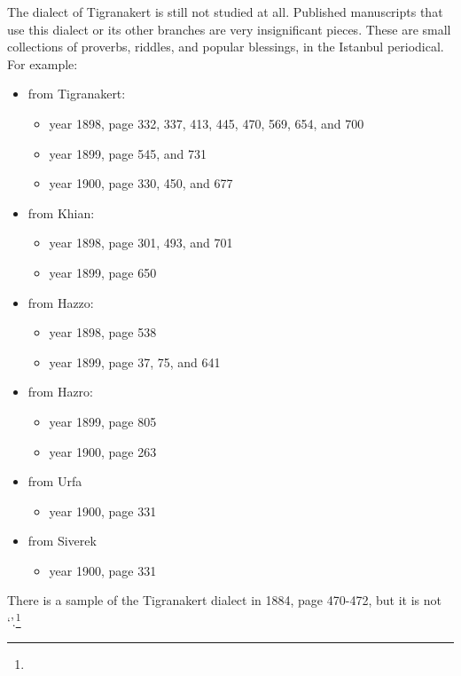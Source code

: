 The dialect of Tigranakert is still not studied at all. Published manuscripts that use this dialect or its other branches are very insignificant pieces. These are small collections of proverbs, riddles, and popular blessings, in the Istanbul  periodical. For example:
\begin{itemize}
	\item from Tigranakert: 
	\begin{itemize}
		\item year 1898, page 332, 337, 413, 445, 470, 569, 654, and 700 
		\item year 1899, page 545, and 731 
		\item year 1900, page 330, 450, and 677 
	\end{itemize}
	\item from Khian: 
	\begin{itemize}
		\item year 1898, page 301, 493, and 701 
		\item year 1899, page 650 
	\end{itemize}
	\item from Hazzo: 
	\begin{itemize}
		\item year 1898, page 538 
		\item year 1899, page 37, 75, and 641 
	\end{itemize}
	\item from Hazro: 
	\begin{itemize}
		\item year 1899, page 805 
		\item year 1900, page 263 
	\end{itemize}
	\item from Urfa 
	\begin{itemize}
		\item year 1900, page 331 
	\end{itemize}
	\item from Siverek 
	\begin{itemize}
		\item year 1900, page 331 
	\end{itemize}
	
\end{itemize}

There is a sample of the Tigranakert dialect in  1884, page 470-472, but it is not `'.\footnote{}

